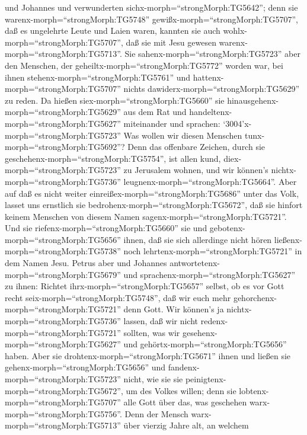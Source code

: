 und Johannes und verwunderten sichx-morph=``strongMorph:TG5642''; denn
sie warenx-morph=``strongMorph:TG5748''
gewißx-morph=``strongMorph:TG5707'', daß es ungelehrte Leute und Laien
waren, kannten sie auch wohlx-morph=``strongMorph:TG5707'', daß sie mit
Jesu gewesen warenx-morph=``strongMorph:TG5713''.  Sie
sahenx-morph=``strongMorph:TG5723'' aber den Menschen, der
geheiltx-morph=``strongMorph:TG5772'' worden war, bei ihnen
stehenx-morph=``strongMorph:TG5761'' und
hattenx-morph=``strongMorph:TG5707'' nichts
dawiderx-morph=``strongMorph:TG5629'' zu reden.  Da hießen
siex-morph=``strongMorph:TG5660'' sie
hinausgehenx-morph=``strongMorph:TG5629'' aus dem Rat und
handeltenx-morph=``strongMorph:TG5627'' miteinander und sprachen:
 `3004'\textbar x-morph=``strongMorph:TG5723'' Was wollen
wir diesen Menschen tunx-morph=``strongMorph:TG5692''? Denn das
offenbare Zeichen, durch sie geschehenx-morph=``strongMorph:TG5754'',
ist allen kund, diex-morph=``strongMorph:TG5723'' zu Jerusalem wohnen,
und wir können's nichtx-morph=``strongMorph:TG5736''
leugnenx-morph=``strongMorph:TG5664''.  Aber auf daß es
nicht weiter einreißex-morph=``strongMorph:TG5686'' unter das Volk,
lasset uns ernstlich sie bedrohenx-morph=``strongMorph:TG5672'', daß sie
hinfort keinem Menschen von diesem Namen
sagenx-morph=``strongMorph:TG5721''.  Und sie
riefenx-morph=``strongMorph:TG5660'' sie und
gebotenx-morph=``strongMorph:TG5656'' ihnen, daß sie sich allerdinge
nicht hören ließenx-morph=``strongMorph:TG5738'' noch
lehrtenx-morph=``strongMorph:TG5721'' in dem Namen Jesu. 
Petrus aber und Johannes antwortetenx-morph=``strongMorph:TG5679'' und
sprachenx-morph=``strongMorph:TG5627'' zu ihnen: Richtet
ihrx-morph=``strongMorph:TG5657'' selbst, ob es vor Gott recht
seix-morph=``strongMorph:TG5748'', daß wir euch mehr
gehorchenx-morph=``strongMorph:TG5721'' denn Gott.  Wir
können's ja nichtx-morph=``strongMorph:TG5736'' lassen, daß wir nicht
redenx-morph=``strongMorph:TG5721'' sollten, was wir
gesehenx-morph=``strongMorph:TG5627'' und
gehörtx-morph=``strongMorph:TG5656'' haben.  Aber sie
drohtenx-morph=``strongMorph:TG5671'' ihnen und ließen sie
gehenx-morph=``strongMorph:TG5656'' und
fandenx-morph=``strongMorph:TG5723'' nicht, wie sie sie
peinigtenx-morph=``strongMorph:TG5672'', um des Volkes willen; denn sie
lobtenx-morph=``strongMorph:TG5707'' alle Gott über das, was geschehen
warx-morph=``strongMorph:TG5756''.  Denn der Mensch
warx-morph=``strongMorph:TG5713'' über vierzig Jahre alt, an welchem
